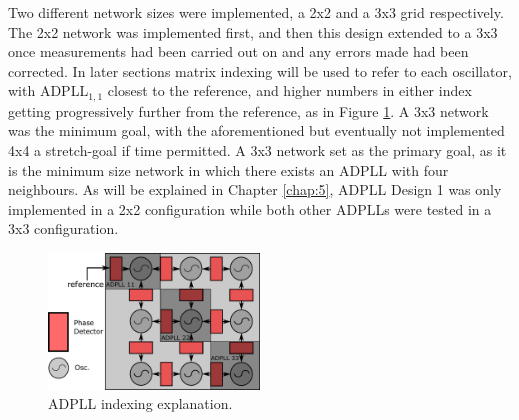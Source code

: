 Two different network sizes were implemented, a 2x2 and a 3x3 grid respectively. The 2x2 network was implemented first, and then this design extended to a 3x3 once measurements had been carried out on and any errors made had been corrected. In later sections matrix indexing will be used to refer to each oscillator, with \ac{ADPLL}$_{1,1}$ closest to the reference, and higher numbers in either index getting progressively further from the reference, as in Figure \ref{fig:network_mine}. A 3x3 network was the minimum goal, with the aforementioned but eventually not implemented 4x4 a stretch-goal if time permitted. A 3x3 network set as the primary goal, as it is the minimum size network in which there exists an \ac{ADPLL} with four neighbours. As will be explained in Chapter \ref{chap:5}, \ac{ADPLL} Design 1 was only implemented in a 2x2 configuration while both other \ac{ADPLL}s were tested in a 3x3 configuration.


\begin{figure}[h]
	\centering
	\includegraphics[width=0.5\textwidth]{../network_annotated}
	\caption[ADPLL indexing explanation]{ADPLL indexing explanation.}
	\label{fig:network_mine}
\end{figure}




